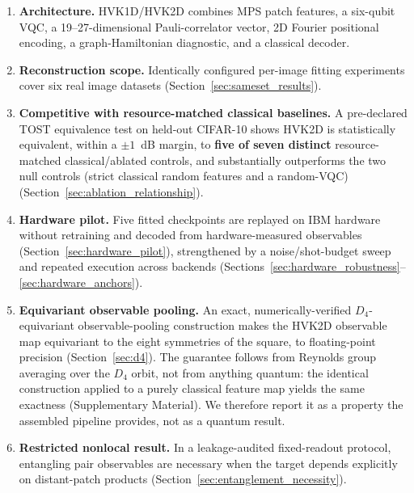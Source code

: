 \documentclass[pdflatex,sn-basic]{sn-jnl}
\newcommand{\snew}[1]{\textbf{\textcolor{studentgreen}{#1}}}
\begin{document}
\begin{enumerate}\itemsep3pt
  \item \textbf{Architecture.} HVK1D/HVK2D combines MPS patch features, a
        six-qubit VQC, a 19--27-dimensional Pauli-correlator vector, 2D Fourier
        positional encoding, a graph-Hamiltonian diagnostic, and a classical
        decoder.
  \item \textbf{Reconstruction scope.} Identically configured per-image fitting
        experiments cover six real image datasets
        (Section~\ref{sec:sameset_results}).
  \item \textbf{Competitive with resource-matched classical baselines.} A
        pre-declared TOST equivalence test on held-out CIFAR-10 shows HVK2D is
        statistically equivalent, within a $\pm1$~dB margin, to \snew{five of seven
        distinct} resource-matched classical/ablated controls, and substantially
        outperforms the two null controls (strict classical random features and
        a random-VQC) (Section~\ref{sec:ablation_relationship}).
  \item \textbf{Hardware pilot.} Five fitted checkpoints are replayed on IBM
        hardware without retraining and decoded from hardware-measured
        observables (Section~\ref{sec:hardware_pilot}), strengthened by a
        noise/shot-budget sweep and repeated execution across backends
        (Sections~\ref{sec:hardware_robustness}--\ref{sec:hardware_anchors}).
  \item \textbf{Equivariant observable pooling.} An exact,
        numerically-verified $D_4$-equivariant observable-pooling construction
        makes the HVK2D observable map equivariant to the eight symmetries of
        the square, to floating-point precision (Section~\ref{sec:d4}). The
        guarantee follows from Reynolds group averaging over the $D_4$ orbit,
        not from anything quantum: the identical construction applied to a
        purely classical feature map yields the same exactness (Supplementary
        Material). We therefore report it as a property the assembled pipeline
        provides, not as a quantum result.
  \item \textbf{Restricted nonlocal result.} In a leakage-audited fixed-readout
        protocol, entangling pair observables are necessary when the target
        depends explicitly on distant-patch products
        (Section~\ref{sec:entanglement_necessity}).
\end{enumerate}
\end{document}
